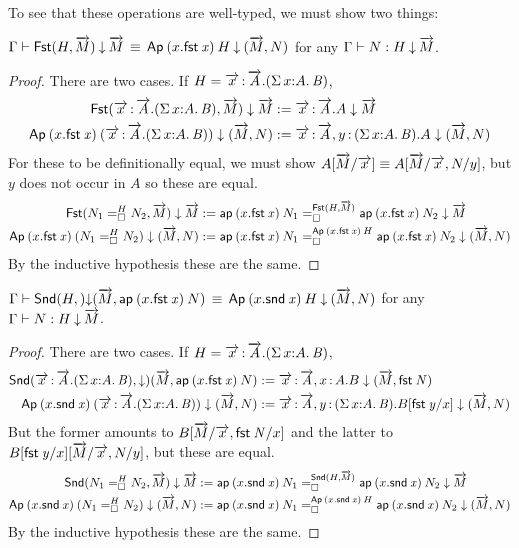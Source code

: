 To see that these operations are well-typed, we must show two things:


\begin{lem}
$\deqdepglob\Gamma{\Fstsigma H{\tel M}}{\tel M}{\Ap{(x.\fst x)}H}{(\tel M,N)}$ for any
$\ofdepglob\Gamma NH{\tel M}$.
\end{lem}
\begin{proof}
There are two cases. If $H=\teltm xA.(\sigmacl xAB)$,
\[\begin{aligned}
\Fstsigma{\teltm xA.(\sigmacl xAB)}{\tel M}\downarrow\tel M
&:= \teltm xA.A\downarrow\tel M \\
\Ap{(x.\fst x)}{(\teltm xA.(\sigmacl xAB))}\downarrow(\tel M,N)
&:= \teltm xA,\tptm y{(\sigmacl xAB)}.A \downarrow(\tel M,N)
\end{aligned}\]
For these to be definitionally equal, we must show $A[\tel M/\tel x]\equiv
A[\tel M/\tel x,N/y]$, but $y$ does not occur in $A$ so these are equal.
\[\begin{aligned}
\Fstsigma{\dhomj H{N_1}{N_2}\blank}{\tel M}\downarrow\tel M
&:= \dhomj{\Fstsigma H{\tel M}}{\ap{(x.\fst x)}{N_1}}{\ap{(x.\fst x)}{N_2}}{\blank}
\downarrow \tel M \\
\Ap{(x.\fst x)}{(\dhomj H{N_1}{N_2}\blank)}\downarrow(\tel M,N)
&:= \dhomj{\Ap{(x.\fst x)} H}{\ap{(x.\fst x)}{N_1}}{\ap{(x.\fst x)}{N_2}}{\blank}
\downarrow (\tel M,N)
\end{aligned}\]
By the inductive hypothesis these are the same.
\end{proof}

\begin{lem}
$\deqdepglob\Gamma{\Sndsigma H}{(\tel M,\ap{(x.\fst x)}N)}{\Ap{(x.\snd x)}H}{(\tel M,N)}$ for any
$\ofdepglob\Gamma NH{\tel M}$.
\end{lem}
\begin{proof}
There are two cases. If $H=\teltm xA.(\sigmacl xAB)$,
\[\begin{aligned}
\Sndsigma{\teltm xA.(\sigmacl xAB)}\downarrow(\tel M,\ap{(x.\fst x)}N)
&:= \teltm xA,\tptm xA.B\downarrow(\tel M,\fst N) \\
\Ap{(x.\snd x)}{(\teltm xA.(\sigmacl xAB))}\downarrow(\tel M,N)
&:= \teltm xA,\tptm y{(\sigmacl xAB)}.B[\fst y/x] \downarrow(\tel M,N)
\end{aligned}\]
But the former amounts to $B[\tel M/\tel x,\fst N/x]$ and the latter to $B[\fst
y/x][\tel M/\tel x,N/y]$, but these are equal.
\[\begin{aligned}
\Sndsigma{\dhomj H{N_1}{N_2}\blank}{\tel M}\downarrow\tel M
&:= \dhomj{\Sndsigma H{\tel M}}{\ap{(x.\snd x)}{N_1}}{\ap{(x.\snd x)}{N_2}}{\blank}
\downarrow\tel M \\
\Ap{(x.\snd x)}{(\dhomj H{N_1}{N_2}\blank)}\downarrow(\tel M,N)
&:= \dhomj{\Ap{(x.\snd x)} H}{\ap{(x.\snd x)}{N_1}}{\ap{(x.\snd x)}{N_2}}{\blank}
\downarrow(\tel M,N)
\end{aligned}\]
By the inductive hypothesis these are the same.
\end{proof}


